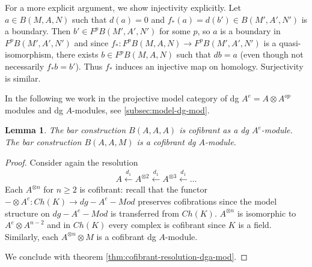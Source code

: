 \documentclass{scrartcl}
\theoremstyle{plain}
\newtheorem{theorem}{Theorem}[section]
\newtheorem{lemma}[theorem]{Lemma}
\theoremstyle{definition}
\newcommand{\from}{\leftarrow}
\let\xfrom\xleftarrow
\newcommand{\blank}{-}
\newcommand{\comp}{\mathbin{\circ}}
\begin{document}
For a more explicit argument, we show injectivity explicitly. Let $a\in B(M, A, N)$ such that $d(a) = 0$ and $f_*(a)=d(b')\in B(M', A', N')$ is a boundary. Then $b'\in F^pB(M', A', N')$ for some $p$, so $a$ is a boundary in $F^pB(M', A', N')$ and since $f_*\colon F^pB(M, A, N)\to F^pB(M', A', N')$ is a quasi-isomorphism, there exists $b\in F^pB(M, A, N)$ such that $db = a$ (even though not necessarily $f_*b = b'$). Thus $f_*$ induces an injective map on homology. Surjectivity is similar. 



In the following we work in the projective model category of dg $A^e=A\otimes A^{op}$ modules and dg $A$-modules, see \ref{subsec:model-dg-mod}.
\begin{lemma}\label{lem:bar-cofibrant}
    The bar construction $B(A, A, A)$ is cofibrant as a dg $A^e$-module. The bar construction $B(A, A, M)$ is a cofibrant dg $A$-module.
\end{lemma}
\begin{proof}
    Consider again the resolution
    \begin{align*}
        A \xfrom{d_1} A^{\otimes 2} \xfrom{d_1} A^{\otimes 3} \xfrom{d_1} \dots
    \end{align*}
    Each $A^{\otimes n}$ for $n\geq 2$ is cofibrant: recall that the functor $\blank\otimes A^e\colon Ch(K)\to dg-A^e-Mod$ preserves cofibrations since the model structure on $dg-A^e-Mod$ is transferred from $Ch(K)$. $A^{\otimes n}$ is isomorphic to $A^e \otimes A^{n-2}$ and in $Ch(K)$ every complex is cofibrant since $K$ is a field. Similarly, each $A^{\otimes n}\otimes M$ is a cofibrant dg $A$-module.

    We conclude with theorem \ref{thm:cofibrant-resolution-dga-mod}. 
\end{proof}
\end{document}
